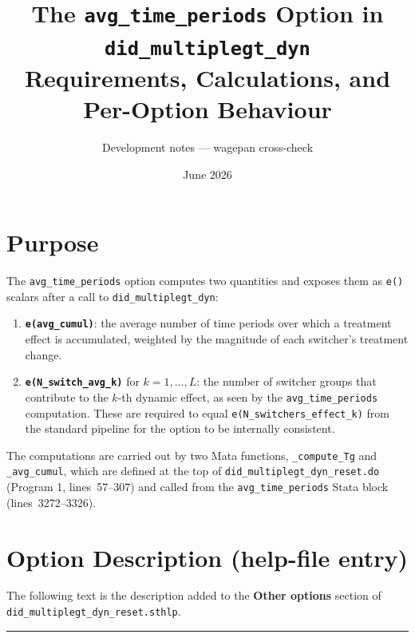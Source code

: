 \documentclass[11pt]{article}
\title{\textbf{The \texttt{avg\_time\_periods} Option in \texttt{did\_multiplegt\_dyn}}\\[6pt]
\large Requirements, Calculations, and Per-Option Behaviour}
\author{Development notes --- wagepan cross-check}
\date{June 2026}
\begin{document}
\maketitle
\tableofcontents
\newpage

\section{Purpose}

The \texttt{avg\_time\_periods} option computes two quantities and exposes them
as \texttt{e()} scalars after a call to \texttt{did\_multiplegt\_dyn}:

\begin{enumerate}[nosep]
  \item \textbf{\texttt{e(avg\_cumul)}}: the average number of time periods over
        which a treatment effect is accumulated, weighted by the magnitude of
        each switcher's treatment change.
  \item \textbf{\texttt{e(N\_switch\_avg\_k)}} for $k = 1,\dots,L$: the number
        of switcher groups that contribute to the $k$-th dynamic effect, as
        seen by the \texttt{avg\_time\_periods} computation. These are required
        to equal \texttt{e(N\_switchers\_effect\_k)} from the standard pipeline
        for the option to be internally consistent.
\end{enumerate}

The computations are carried out by two Mata functions,
\texttt{\_compute\_Tg} and \texttt{\_avg\_cumul}, which are defined at the top
of \texttt{did\_multiplegt\_dyn\_reset.do} (Program 1, lines~57--307) and
called from the \texttt{avg\_time\_periods} Stata block (lines~3272--3326).

\section{Option Description (help-file entry)}

The following text is the description added to the \textbf{Other options}
section of \texttt{did\_multiplegt\_dyn\_reset.sthlp}.

\bigskip
\noindent\rule{\linewidth}{0.4pt}
\end{document}
